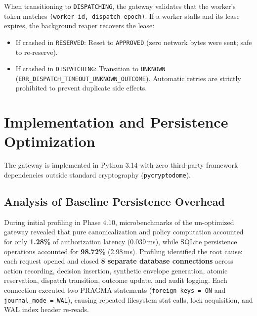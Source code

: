 \documentclass[sigconf,anonymous,review]{acmart}
\begin{document}
When transitioning to \texttt{DISPATCHING}, the gateway validates that the worker's token matches \texttt{(worker\_id, dispatch\_epoch)}. If a worker stalls and its lease expires, the background reaper recovers the lease:
\begin{itemize}
    \item If crashed in \texttt{RESERVED}: Reset to \texttt{APPROVED} (zero network bytes were sent; safe to re-reserve).
    \item If crashed in \texttt{DISPATCHING}: Transition to \texttt{UNKNOWN} (\texttt{ERR\_DISPATCH\_TIMEOUT\_UNKNOWN\_OUTCOME}). Automatic retries are strictly prohibited to prevent duplicate side effects.
\end{itemize}

\section{Implementation and Persistence Optimization}

The gateway is implemented in Python 3.14 with zero third-party framework dependencies outside standard cryptography (\texttt{pycryptodome}). 

\subsection{Analysis of Baseline Persistence Overhead}
During initial profiling in Phase 4.10, microbenchmarks of the un-optimized gateway revealed that pure canonicalization and policy computation accounted for only \textbf{1.28\%} of authorization latency (0.039\,ms), while SQLite persistence operations accounted for \textbf{98.72\%} (2.98\,ms). Profiling identified the root cause: each request opened and closed \textbf{8 separate database connections} across action recording, decision insertion, synthetic envelope generation, atomic reservation, dispatch transition, outcome update, and audit logging. Each connection executed two PRAGMA statements (\texttt{foreign\_keys = ON} and \texttt{journal\_mode = WAL}), causing repeated filesystem stat calls, lock acquisition, and WAL index header re-reads.
\end{document}
